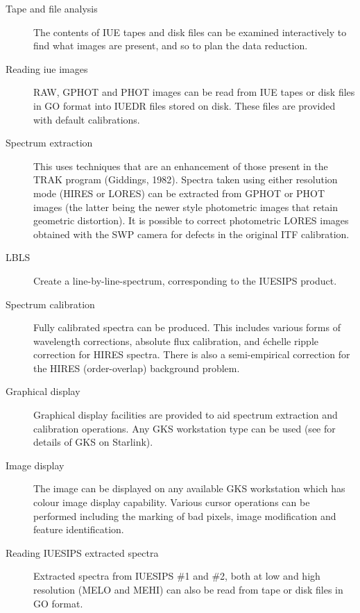 \begin {description}

\item [Tape and file analysis]
The contents of IUE tapes and disk files can be examined interactively to find
what images are present, and so to plan the data reduction.

\item [Reading iue images]
RAW, GPHOT and PHOT images can be read from IUE tapes or disk files in GO
format into IUEDR files stored on disk.
These files are provided with default calibrations.

\item [Spectrum extraction]
This uses techniques that are an enhancement of those pre\-sent in the TRAK
program (Giddings, 1982).
Spectra taken using either resolution mode (HIRES or LORES) can be
extracted from GPHOT or PHOT images (the latter being the newer
style photometric images that retain geometric distortion).
It is possible to correct photometric LORES images obtained with the SWP
camera for defects in the original ITF calibration.

\item [LBLS]
Create a line-by-line-spectrum, corresponding to the IUESIPS product.

\item [Spectrum calibration]
Fully calibrated spectra can be produced.
This includes various forms of wavelength corrections,
absolute flux calibration, and \'{e}chelle ripple correction for HIRES
spectra.
There is also a semi-empirical correction for the HIRES (order-overlap)
background problem.

\item [Graphical display]
Graphical display facilities are provided to aid spectrum extraction and
calibration operations.
Any GKS workstation type can be used (see
 for details of GKS on Starlink).

\item [Image display]
The image can be displayed on any available GKS workstation which has colour
image display capability.
Various cursor operations can be performed including the marking of bad
pixels, image modification and feature identification.

\item [Reading IUESIPS extracted spectra]
Extracted spectra from IUESIPS \#1 and \#2, both at low and high resolution
(MELO and MEHI) can also be read from tape or disk files in GO format.


\end{description}
